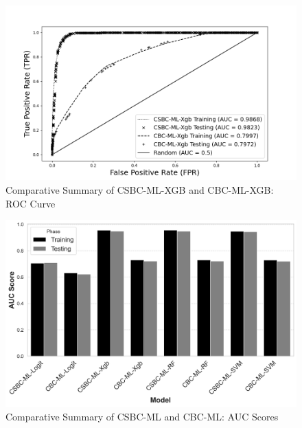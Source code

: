 \begin{figure}[h] %
	\centering
	\includegraphics[width=0.8 \textwidth]{csbc_cbc_xgb.png} %
	\caption{Comparative Summary of CSBC-ML-XGB and CBC-ML-XGB: ROC Curve}
	\label{fig:model_comparison_roc} %
\end{figure}

\begin{figure}[h] %
	\centering
	\includegraphics[scale=0.6]{auc_comparisonbw.png} %
	\caption{Comparative Summary of CSBC-ML and CBC-ML: AUC Scores}
	\label{fig:model_comparison_auc} %
\end{figure}

